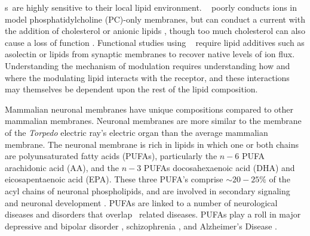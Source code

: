 \nachr s~are highly sensitive to their local lipid environment. \nachr~ poorly conducts ions in model phosphatidylcholine (PC)-only membranes, but can conduct a current with the addition of cholesterol or anionic lipids \cite{Baenziger2017,Dalziel1980,Ellena1983,M.CriadoH.Eibl1982,Fong1986,Fong1987,Jones1988,Sunshine1994,DaCosta2009b,Baenziger2017}, though too much  cholesterol can also cause a loss of function \cite{M.CriadoH.Eibl1982,Mantipragada2003,Barrantes2010a,Baier2011a}. %
Functional studies using \xo~ \cite{Zhou2003,Gamba2005,Chen2015,Kouvatsos2016,Nys2016,Polovinkin2018,Moffett2019,Kumar2020} require lipid additives such as asolectin\cite{M.CriadoH.Eibl1982,Zhou2003,Gamba2005,Chen2015,Nys2016,Polovinkin2018,Moffett2019,Kumar2020} or lipids from synaptic membranes \cite{Conti2013} to recover native levels of \nachr{} ion flux.  %
Understanding the mechanism of modulation requires understanding how and where the modulating lipid interacts with the receptor, and these interactions may themselves be dependent upon the rest of the lipid composition.  

Mammalian neuronal membranes \cite{Isolated1969, Taguchi2010, Breckenridge1973,Ingolfsson2017b} have unique compositions compared to other mammalian membranes\cite{McEvoy2000,Kim2001,VanMeer2010,Lorent2020,Ingolfsson2014}. Neuronal membranes are more similar to the membrane of the \textit{Torpedo} electric ray's electric organ \cite{Barrantes1989a,Quesada2016} than the average mammalian membrane\cite{Ingolfsson2014}. The neuronal membrane \cite{Isolated1969, Taguchi2010, Breckenridge1973,Ingolfsson2017b} is rich in lipids in which one or both chains are polyunsaturated fatty acids (PUFAs), particularly the $n-6$ PUFA arachidonic acid (AA), and the $n-3$ PUFAs docosahexaenoic acid (DHA) and eicosapentaenoic acid (EPA). These three PUFA's comprise $\sim20-25\%$ of the acyl chains of neuronal phospholipids, and are involved in secondary signaling \cite{McNamara2006,McNamara2008} and neuronal development \cite{Maekawa2017}. PUFAs are linked to a number of neurological diseases and disorders that overlap \nachr~related diseases. PUFAs play a roll in major depressive and bipolar disorder \cite{Adibhatla2007,McNamara2008,Schneider2017,Koga2019,Hamazaki2015}, schizophrenia \cite{Peet2003,Bushe2005,Berger2006,Schneider2017,Maekawa2017,Hamazaki2015}, and Alzheimer's Disease \cite{Conquer2000,DiPaolo2011,Bennett2013,Adibhatla2007,Yadav2014,Escriba2017}. %

